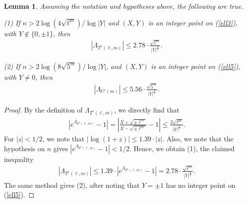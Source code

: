 \documentclass[12pt]{amsart}
\newtheorem{lem}{Lemma}[section]
\newcommand{\?}{\color{red}?}
\numberwithin{equation}{section}
\begin{document}
\begin{lem}\label{lambdabound} Assuming the notation and hypotheses above, the following are true.

\noindent
(1)  If $n>2\log(4\sqrt{\ell^m})/\log |Y|$ and $(X,Y)$ is an integer point on (\ref{ell3}),  with $Y\not \in \{0,\pm 1\}$, then
\begin{align*}
    |\Lambda_{T^{\varepsilon}(\ell,m)}|\leq 2.78\cdot \frac{\sqrt{\ell^{m}}}{|Y|^{\frac{n}{2}}}.
\end{align*}

\noindent
(2) If $n>2\log(8\sqrt{5^m})/\log |Y|$, and $(X,Y)$ is an integer point on (\ref{ell5}), with $Y\neq 0$, then 
\begin{align*}
    |\Lambda_{U^{\varepsilon}(m)}|\leq 5.56\cdot \frac{\sqrt{5^{m}}}{|Y|^{\frac{n}{2}}}.
\end{align*}
\end{lem}
\begin{proof}
By the definition of $\Lambda_{T^{\varepsilon}(\ell,m)}$, we directly find that
\begin{align}\label{lambda1}
    |e^{\Lambda_{T^{\varepsilon}(\ell,m)}}-1|=
    \left|\frac{X+\sqrt{\pm\ell^m}}{X-\sqrt{\pm\ell^m}}-1\right|\leq\frac{2\sqrt{\ell^m}}{{|Y|^{\frac{n}{2}}}}.
\end{align}
For $|z|<1/2$, we note that
$|\log(1+z)|\leq 1.39\cdot |z|.$
Also, we note that the hypothesis on $n$ gives $|e^{\Lambda_{T^{\varepsilon}(\ell,m)}}-1|<1/2$.
Hence, we obtain (1), the claimed inequality
\begin{align*}
    |\Lambda_{T^{\varepsilon}(\ell,m)}|\leq 1.39\cdot |e^{\Lambda_{T^{\varepsilon}(\ell,m)}}-1|=2.78\cdot \frac{\sqrt{\ell^m}}{{|Y|^{\frac{n}{2}}}}.
\end{align*}
 The same method gives (2), after noting that $Y=\pm 1$  has no integer point on (\ref{ell5}). 
\end{proof}
\end{document}
